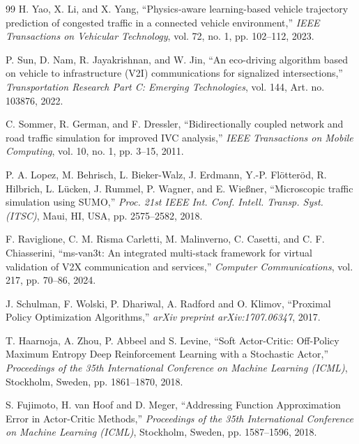 \documentclass[journal]{IEEEtran}
\begin{document}
\begin{thebibliography}{99}
 H. Yao, X. Li, and X. Yang, ``Physics-aware learning-based vehicle trajectory prediction of congested traffic in a connected vehicle environment,'' \emph{IEEE Transactions on Vehicular Technology}, vol. 72, no. 1, pp. 102--112, 2023.

 P. Sun, D. Nam, R. Jayakrishnan, and W. Jin, ``An eco-driving algorithm based on vehicle to infrastructure (V2I) communications for signalized intersections,'' \emph{Transportation Research Part C: Emerging Technologies}, vol. 144, Art. no. 103876, 2022.

 C. Sommer, R. German, and F. Dressler, ``Bidirectionally coupled network and road traffic simulation for improved IVC analysis,'' \emph{IEEE Transactions on Mobile Computing}, vol. 10, no. 1, pp. 3--15, 2011.

 P. A. Lopez, M. Behrisch, L. Bieker-Walz, J. Erdmann, Y.-P. Fl\"otter\"od, R. Hilbrich, L. L\"ucken, J. Rummel, P. Wagner, and E. Wie\ss ner, ``Microscopic traffic simulation using SUMO,'' \emph{Proc. 21st IEEE Int. Conf. Intell. Transp. Syst. (ITSC)}, Maui, HI, USA, pp. 2575--2582, 2018.

 F. Raviglione, C. M. Risma Carletti, M. Malinverno, C. Casetti, and C. F. Chiasserini, ``ms-van3t: An integrated multi-stack framework for virtual validation of V2X communication and services,'' \emph{Computer Communications}, vol. 217, pp. 70--86, 2024.

 J. Schulman, F. Wolski, P. Dhariwal, A. Radford and O. Klimov, ``Proximal Policy Optimization Algorithms,'' \emph{arXiv preprint arXiv:1707.06347}, 2017.

 T. Haarnoja, A. Zhou, P. Abbeel and S. Levine, ``Soft Actor-Critic: Off-Policy Maximum Entropy Deep Reinforcement Learning with a Stochastic Actor,'' \emph{Proceedings of the 35th International Conference on Machine Learning (ICML)}, Stockholm, Sweden, pp. 1861--1870, 2018.

 S. Fujimoto, H. van Hoof and D. Meger, ``Addressing Function Approximation Error in Actor-Critic Methods,'' \emph{Proceedings of the 35th International Conference on Machine Learning (ICML)}, Stockholm, Sweden, pp. 1587--1596, 2018.

\end{thebibliography}
\end{document}
